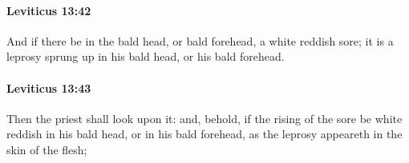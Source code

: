 		\paragraph{Leviticus 13:42} %
			\label{LEVITICUS-13-42}

			And if there be in the bald head, or bald forehead, a white reddish sore; it is a leprosy sprung up in his bald head, or his bald forehead.


		\paragraph{Leviticus 13:43} %
			\label{LEVITICUS-13-43}

			Then the priest shall look upon it: and, behold, if the rising of the sore be white reddish in his bald head, or in his bald forehead, as the leprosy appeareth in the skin of the flesh;


